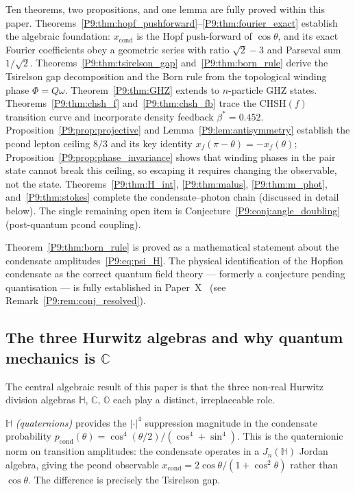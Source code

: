 \documentclass[11pt,a4paper]{article}
\theoremstyle{definition}
\theoremstyle{remark}
\newcommand{\bst}{\beta^{*}}
\newcommand{\CC}{\mathbb{C}}
\newcommand{\HH}{\mathbb{H}}
\newcommand{\OO}{\mathbb{O}}
\newcommand{\pcond}{p_{\mathrm{cond}}}
\newcommand{\xcond}{x_{\mathrm{cond}}}
\begin{document}
Ten theorems, two propositions, and one lemma are fully proved within
this paper.
Theorems~\ref{P9:thm:hopf_pushforward}--\ref{P9:thm:fourier_exact} establish
the algebraic foundation: $\xcond$ is the Hopf push-forward of $\cos\theta$,
and its exact Fourier coefficients obey a geometric series with ratio
$\sqrt{2}-3$ and Parseval sum $1/\sqrt{2}$.
Theorems~\ref{P9:thm:tsirelson_gap} and~\ref{P9:thm:born_rule} derive the
Tsirelson gap decomposition and the Born rule from the topological
winding phase $\Phi=Q\omega$.
Theorem~\ref{P9:thm:GHZ} extends to $n$-particle GHZ states.
Theorems~\ref{P9:thm:chsh_f} and~\ref{P9:thm:chsh_fb} trace the CHSH$(f)$
transition curve and incorporate density feedback $\bst=0.452$.
Proposition~\ref{P9:prop:projective} and Lemma~\ref{P9:lem:antisymmetry}
establish the pcond lepton ceiling $8/3$ and its key identity
$x_f(\pi-\theta)=-x_f(\theta)$; Proposition~\ref{P9:prop:phase_invariance}
shows that winding phases in the pair state cannot break this ceiling,
so escaping it requires changing the observable, not the state.
Theorems~\ref{P9:thm:H_int}, \ref{P9:thm:malus}, \ref{P9:thm:m_phot},
and~\ref{P9:thm:stokes} complete the condensate--photon chain (discussed
in detail below).
The single remaining open item is
Conjecture~\ref{P9:conj:angle_doubling} (post-quantum pcond coupling).
 
Theorem~\ref{P9:thm:born_rule} is proved as a mathematical statement about
the condensate amplitudes~\eqref{P9:eq:psi_H}.
The physical identification of the Hopfion condensate as the correct
quantum field theory --- formerly a conjecture pending quantisation ---
is fully established in Paper~X~\cite{Paper10}
(see Remark~\ref{P9:rem:conj_resolved}).
 
\subsection{The three Hurwitz algebras and why quantum mechanics is $\CC$}
 
The central algebraic result of this paper is that the three non-real
Hurwitz division algebras $\HH$, $\CC$, $\OO$ each play a distinct,
irreplaceable role.
 
$\HH$ \emph{(quaternions)} provides the $|\cdot|^4$ suppression magnitude
in the condensate probability $\pcond(\theta) = \cos^4(\theta/2)/(\cos^4+\sin^4)$.
This is the quaternionic norm on transition amplitudes: the condensate
operates in a $J_n(\HH)$ Jordan algebra, giving the pcond observable
$\xcond = 2\cos\theta/(1+\cos^2\theta)$ rather than $\cos\theta$.
The difference is precisely the Tsirelson gap.
 
\end{document}
